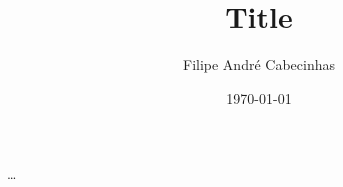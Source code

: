 \documentclass[a4paper,11pt]{article}
\author{Filipe André Cabecinhas}
\title{Title}
\date{\today}
\begin{document}
\maketitle

\ldots
\end{document}
